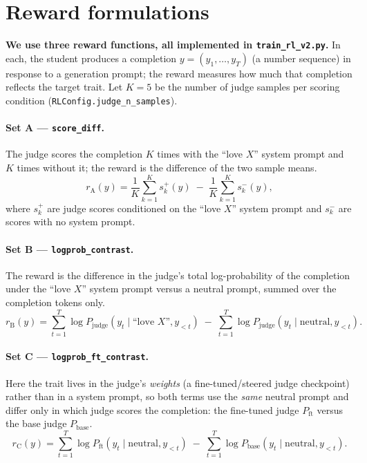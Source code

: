 \section{Reward formulations}\label{app:rewards}

\textbf{We use three reward functions, all implemented in \texttt{train\_rl\_v2.py}.} In each, the student produces a completion $y = (y_1,\dots,y_T)$ (a number sequence) in response to a generation prompt; the reward measures how much that completion reflects the target trait. Let $K = 5$ be the number of judge samples per scoring condition (\texttt{RLConfig.judge\_n\_samples}).

\paragraph{Set A --- \texttt{score\_diff}.} The judge scores the completion $K$ times with the ``love $X$'' system prompt and $K$ times without it; the reward is the difference of the two sample means.
\begin{equation}
r_{\mathrm{A}}(y) = \frac{1}{K}\sum_{k=1}^{K} s^{+}_{k}(y) \;-\; \frac{1}{K}\sum_{k=1}^{K} s^{-}_{k}(y),
\end{equation}
where $s^{+}_{k}$ are judge scores conditioned on the ``love $X$'' system prompt and $s^{-}_{k}$ are scores with no system prompt.

\paragraph{Set B --- \texttt{logprob\_contrast}.} The reward is the difference in the judge's total log-probability of the completion under the ``love $X$'' system prompt versus a neutral prompt, summed over the completion tokens only.
\begin{equation}
r_{\mathrm{B}}(y) = \sum_{t=1}^{T} \log P_{\mathrm{judge}}\!\left(y_t \mid \text{``love } X\text{''}, y_{<t}\right) \;-\; \sum_{t=1}^{T} \log P_{\mathrm{judge}}\!\left(y_t \mid \text{neutral}, y_{<t}\right).
\end{equation}

\paragraph{Set C --- \texttt{logprob\_ft\_contrast}.} Here the trait lives in the judge's \emph{weights} (a fine-tuned/steered judge checkpoint) rather than in a system prompt, so both terms use the \emph{same} neutral prompt and differ only in which judge scores the completion: the fine-tuned judge $P_{\mathrm{ft}}$ versus the base judge $P_{\mathrm{base}}$.
\begin{equation}
r_{\mathrm{C}}(y) = \sum_{t=1}^{T} \log P_{\mathrm{ft}}\!\left(y_t \mid \text{neutral}, y_{<t}\right) \;-\; \sum_{t=1}^{T} \log P_{\mathrm{base}}\!\left(y_t \mid \text{neutral}, y_{<t}\right).
\end{equation}

